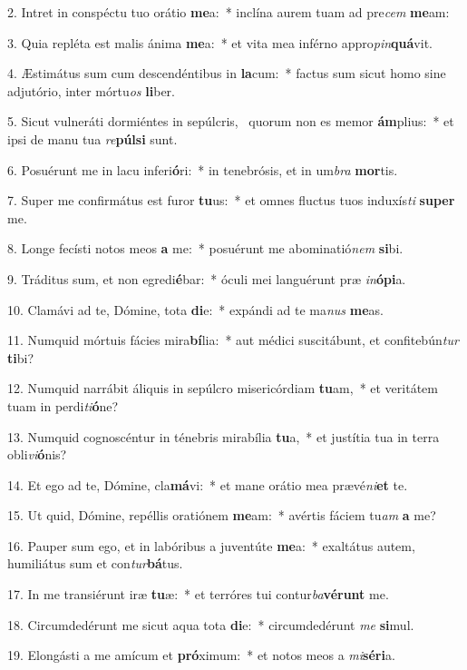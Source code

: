 2. Intret in conspéctu tuo orátio \textbf{me}a:~*  inclína aurem tuam ad pre\textit{cem} \textbf{me}am:\

3. Quia repléta est malis ánima \textbf{me}a:~*  et vita mea inférno appro\textit{pin}\textbf{quá}vit.\

4. Æstimátus sum cum descendéntibus in \textbf{la}cum:~*  factus sum sicut homo sine adjutório, inter mórtu\textit{os} \textbf{li}ber.\

5. Sicut vulneráti dormiéntes in sepúlcris, \dag\  quorum non es memor \textbf{ám}plius:~*  et ipsi de manu tua \textit{re}\textbf{púl}\textbf{si} sunt.\

6. Posuérunt me in lacu inferi\textbf{ó}ri:~*  in tenebrósis, et in um\textit{bra} \textbf{mor}tis.\

7. Super me confirmátus est furor \textbf{tu}us:~*  et omnes fluctus tuos induxís\textit{ti} \textbf{su}\textbf{per} me.\

8. Longe fecísti notos meos \textbf{a} me:~*  posuérunt me abominatió\textit{nem} \textbf{si}bi.\

9. Tráditus sum, et non egredi\textbf{é}bar:~*  óculi mei languérunt præ \textit{in}\textbf{ó}\textbf{pi}a.\

10. Clamávi ad te, Dómine, tota \textbf{di}e:~*  expándi ad te ma\textit{nus} \textbf{me}as.\

11. Numquid mórtuis fácies mira\textbf{bí}lia:~*  aut médici suscitábunt, et confitebún\textit{tur} \textbf{ti}bi?\

12. Numquid narrábit áliquis in sepúlcro misericórdiam \textbf{tu}am,~*  et veritátem tuam in perdi\textit{ti}\textbf{ó}ne?\

13. Numquid cognoscéntur in ténebris mirabília \textbf{tu}a,~*  et justítia tua in terra obli\textit{vi}\textbf{ó}nis?\

14. Et ego ad te, Dómine, cla\textbf{má}vi:~*  et mane orátio mea prævé\textit{ni}\textbf{et} te.\

15. Ut quid, Dómine, repéllis oratiónem \textbf{me}am:~*  avértis fáciem tu\textit{am} \textbf{a} me?\

16. Pauper sum ego, et in labóribus a juventúte \textbf{me}a:~*  exaltátus autem, humiliátus sum et con\textit{tur}\textbf{bá}tus.\

17. In me transiérunt iræ \textbf{tu}æ:~*  et terróres tui contur\textit{ba}\textbf{vé}\textbf{runt} me.\

18. Circumdedérunt me sicut aqua tota \textbf{di}e:~*  circumdedérunt \textit{me} \textbf{si}mul.\

19. Elongásti a me amícum et \textbf{pró}ximum:~*  et notos meos a \textit{mi}\textbf{sé}\textbf{ri}a.\


